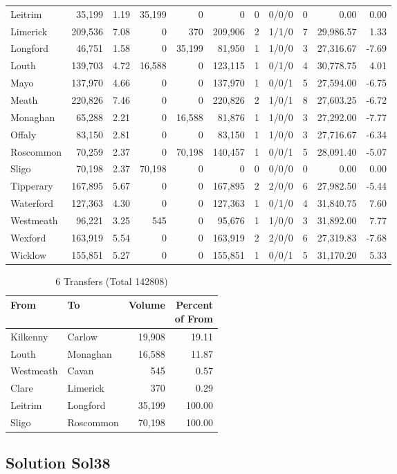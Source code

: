 \documentclass[a4paper]{article}
\begin{document}
\begin{longtable}{lrrrrrrlrrr}
Leitrim&35,199& 1.19&35,199&0&0&0&0/0/0&0& 0.00& 0.00\\ 
Limerick&209,536& 7.08&0&370&209,906&2&1/1/0&7&29,986.57& 1.33\\ 
Longford&46,751& 1.58&0&35,199&81,950&1&1/0/0&3&27,316.67&-7.69\\ 
Louth&139,703& 4.72&16,588&0&123,115&1&0/1/0&4&30,778.75& 4.01\\ 
Mayo&137,970& 4.66&0&0&137,970&1&0/0/1&5&27,594.00&-6.75\\ 
Meath&220,826& 7.46&0&0&220,826&2&1/0/1&8&27,603.25&-6.72\\ 
Monaghan&65,288& 2.21&0&16,588&81,876&1&1/0/0&3&27,292.00&-7.77\\ 
Offaly&83,150& 2.81&0&0&83,150&1&1/0/0&3&27,716.67&-6.34\\ 
Roscommon&70,259& 2.37&0&70,198&140,457&1&0/0/1&5&28,091.40&-5.07\\ 
Sligo&70,198& 2.37&70,198&0&0&0&0/0/0&0& 0.00& 0.00\\ 
Tipperary&167,895& 5.67&0&0&167,895&2&2/0/0&6&27,982.50&-5.44\\ 
Waterford&127,363& 4.30&0&0&127,363&1&0/1/0&4&31,840.75& 7.60\\ 
Westmeath&96,221& 3.25&545&0&95,676&1&1/0/0&3&31,892.00& 7.77\\ 
Wexford&163,919& 5.54&0&0&163,919&2&2/0/0&6&27,319.83&-7.68\\ 
Wicklow&155,851& 5.27&0&0&155,851&1&0/0/1&5&31,170.20& 5.33\\ 
\end{longtable}

\begin{table}[htbp]
\caption{6 Transfers (Total 142808)}
\centering
\begin{tabular}{llrr} \toprule
From &To &Volume &\shortstack{Percent\\of From} \\ \midrule
Kilkenny&Carlow&19,908&19.11\\ 
Louth&Monaghan&16,588&11.87\\ 
Westmeath&Cavan&545& 0.57\\ 
Clare&Limerick&370& 0.29\\ 
Leitrim&Longford&35,199&100.00\\ 
Sligo&Roscommon&70,198&100.00\\ 
\bottomrule
\end{tabular}
\end{table}

\clearpage
\subsection{Solution Sol38}
\end{document}
